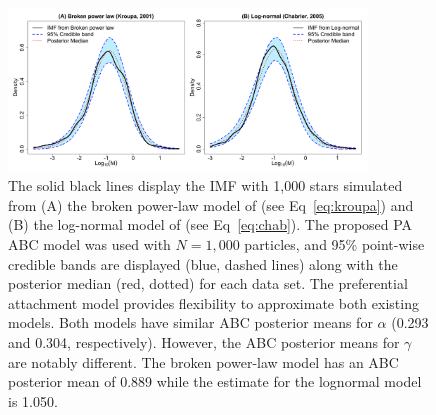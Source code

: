 \documentclass[12pt]{article}
\begin{document}
\begin{figure} \centering
	\includegraphics[width=0.85\textwidth]{figures/KroupaChabrier.pdf}
	\vspace{-0.1in}
	\caption{The solid black lines display the IMF with 1,000 stars simulated from (A) the broken power-law model of \cite{kroupa2001} (see Eq~\eqref{eq:kroupa}) and (B) the log-normal model of \cite{Chabrier:2003om, Chabrier:2003oq}  (see Eq~\eqref{eq:chab}).  The proposed PA ABC model was used with $N = 1,000$ particles, and 95\% point-wise credible bands are displayed (blue, dashed lines) along with the posterior median (red, dotted) for each data set.  The preferential attachment model provides flexibility to approximate both existing models.
Both models have similar ABC posterior means for $\alpha$ (0.293 and 0.304, respectively).  However, the ABC posterior means for $\gamma$ are notably different.  The broken power-law model has an ABC posterior mean of 0.889 while the estimate for the lognormal model is 1.050.
	}
	\label{fig:otherModels}
\end{figure}
\end{document}
